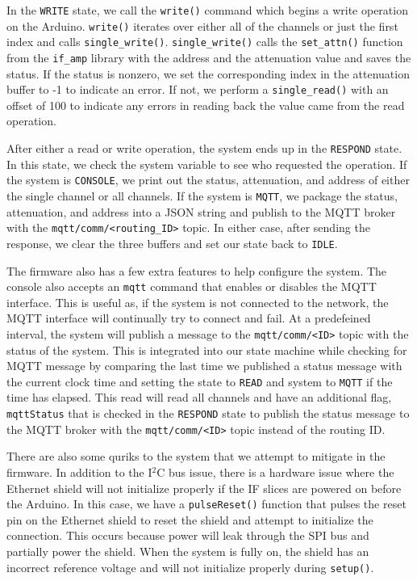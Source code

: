 In the \texttt{WRITE} state, we call the \texttt{write()} command which begins a write operation on the Arduino.
\texttt{write()} iterates over either all of the channels or just the first index and calls \texttt{single\_write()}.
\texttt{single\_write()} calls the \texttt{set\_attn()} function from the \texttt{if\_amp} library with the address and the attenuation value and saves the status. 
If the status is nonzero, we set the corresponding index in the attenuation buffer to -1 to indicate an error.
If not, we perform a \texttt{single\_read()} with an offset of 100 to indicate any errors in reading back the value came from the read operation. 

After either a read or write operation, the system ends up in the \texttt{RESPOND} state.
In this state, we check the system variable to see who requested the operation.
If the system is \texttt{CONSOLE}, we print out the status, attenuation, and address of either the single channel or all channels.
If the system is \texttt{MQTT}, we package the status, attenuation, and address into a JSON string and publish to the MQTT broker with the \texttt{mqtt/comm/<routing\_ID>} topic.
In either case, after sending the response, we clear the three buffers and set our state back to \texttt{IDLE}.

The firmware also has a few extra features to help configure the system.
The console also accepts an \texttt{mqtt} command that enables or disables the MQTT interface.
This is useful as, if the system is not connected to the network, the MQTT interface will continually try to connect and fail.
At a predefeined interval, the system will publish a message to the \texttt{mqtt/comm/<ID>} topic with the status of the system.
This is integrated into our state machine while checking for MQTT message by comparing the last time we published a status message with the current clock time and setting the state to \texttt{READ} and system to \texttt{MQTT} if the time has elapsed.
This read will read all channels and have an additional flag, \texttt{mqttStatus} that is checked in the \texttt{RESPOND} state to publish the status message to the MQTT broker with the \texttt{mqtt/comm/<ID>} topic instead of the routing ID.

There are also some quriks to the system that we attempt to mitigate in the firmware.
In addition to the I$^2$C bus issue, there is a hardware issue where the Ethernet shield will not initialize properly if the IF slices are powered on before the Arduino. 
In this case, we have a \texttt{pulseReset()} function that pulses the reset pin on the Ethernet shield to reset the shield and attempt to initialize the connection.
This occurs because power will leak through the SPI bus and partially power the shield.
When the system is fully on, the shield has an incorrect reference voltage and will not initialize properly during \texttt{setup()}.

